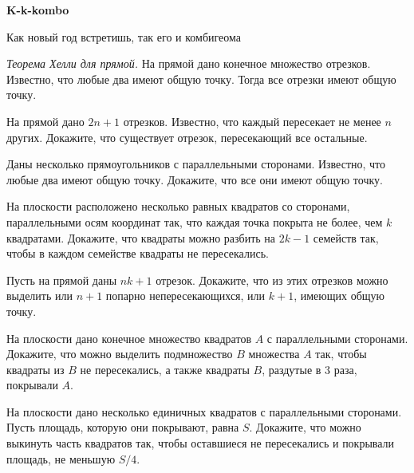 \centerline{\bf \Huge K-k-kombo}
\centerline{\bf \Huge }

\begin{flushright}
        \scriptsize{Как новый год встретишь, так его и комбигеома}
\end{flushright}

\textit{Теорема Хелли для прямой.} На прямой дано конечное множество отрезков. Известно, что любые два имеют общую точку. Тогда все отрезки имеют общую точку.

 На прямой дано $2 n+1$ отрезков. Известно, что каждый пересекает не менее $n$ других. Докажите, что существует отрезок, пересекающий все остальные.

 Даны несколько прямоугольников с параллельными сторонами. Известно, что любые два имеют общую точку. Докажите, что все они имеют общую точку.

 На плоскости расположено несколько равных квадратов со сторонами, параллельными осям координат так, что каждая точка покрыта не более, чем $k$ квадратами. Докажите, что квадраты можно разбить на $2 k-1$ семейств так, чтобы в каждом семействе квадраты не пересекались.

 Пусть на прямой даны $n k+1$ отрезок. Докажите, что из этих отрезков можно выделить или $n+1$ попарно непересекающихся, или $k+1$, имеющих общую точку.

 На плоскости дано конечное множество квадратов $A$ с параллельными сторонами. Докажите, что можно выделить подмножество $B$ множества $A$ так, чтобы квадраты из $B$ не пересекались, а также квадраты $B$, раздутые в 3 раза, покрывали $A$.

 На плоскости дано несколько единичных квадратов с параллельными сторонами. Пусть площадь, которую они покрывают, равна $S$. Докажите, что можно выкинуть часть квадратов так, чтобы оставшиеся не пересекались и покрывали площадь, не меньшую $S / 4$.